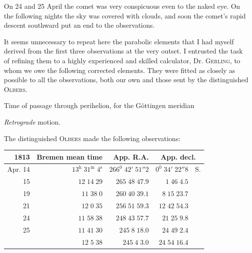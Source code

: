 On 24 and 25 April the comet was very conspicuous even to the naked eye. On the following nights the sky was covered with clouds, and soon the comet’s rapid descent southward put an end to the observations.

\SourceGathering{4\textsuperscript{*}}
It seems unnecessary to repeat here the parabolic elements that I had myself derived from the first three observations at the very outset. I entrusted the task of refining them to a highly experienced and skilled calculator, Dr. \textsc{Gerling}, to whom we owe the following corrected elements. They were fitted as closely as possible to all the observations, both our own and those sent by the distinguished \textsc{Olbers}.
\par\medskip
\noindent\begin{minipage}{.975\linewidth}\small
\noindent{}\par
\noindent Time of passage through perihelion, for the Göttingen meridian\par
\noindent{}\par
\noindent{}\par
\noindent{}\par
\noindent{}\par
\noindent \textit{Retrograde} motion.\par
\end{minipage}\par\medskip

The distinguished \textsc{Olbers} made the following observations:
\begin{center}\small\setlength{\tabcolsep}{4pt}
\begin{tabular}{r|r|r|r l}
1813&Bremen mean time&App. R.A.&\multicolumn{2}{c}{App. decl.}\\\hline
Apr. 14&$13^{\mathrm h}\;31^{\mathrm m}\;4^{\mathrm s}$&$266^0\;42'\;51''2$&$0^0\;34'\;22''8$&S.\\
15&$12\;14\;29$&$265\;48\;47.9$&$1\;46\;4.5$&\\
19&$11\;38\;0$&$260\;40\;39.1$&$8\;15\;23.7$&\\
21&$12\;0\;35$&$256\;51\;59.3$&$12\;42\;54.3$&\\
24&$11\;58\;38$&$248\;43\;57.7$&$21\;25\;9.8$&\\
25&$11\;41\;30$&$245\;8\;18.0$&$24\;49\;2.4$&\\
&$12\;5\;38$&$245\;4\;3.0$&$24\;54\;16.4$&
\end{tabular}\end{center}

